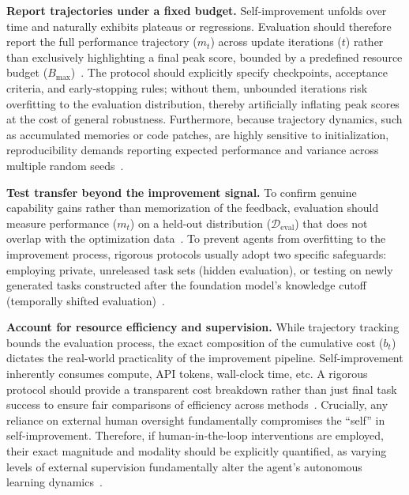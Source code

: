 \textbf{Report trajectories under a fixed budget.}
Self-improvement unfolds over time and naturally exhibits plateaus or regressions. Evaluation should therefore report the full performance trajectory ($m_t$) across update iterations ($t$) rather than exclusively highlighting a final peak score,  bounded by a predefined resource budget ($B_{\text{max}}$)~\citep{xi2024agentgym}. The protocol should explicitly specify checkpoints, acceptance criteria, and early-stopping rules; without them, unbounded iterations risk overfitting to the evaluation distribution, thereby artificially inflating peak scores at the cost of general robustness. Furthermore, because trajectory dynamics, such as accumulated memories or code patches, are highly sensitive to initialization, reproducibility demands reporting expected performance and variance across multiple random seeds~\citep{siegel2024corebenchfosteringcredibilitypublished, aleithan2024swebenchenhancedcodingbenchmark}.


\textbf{Test transfer beyond the improvement signal.}
To confirm genuine capability gains rather than  memorization of the feedback, evaluation should measure performance ($m_t$) on a  held-out distribution ($\mathcal{D}_{\text{eval}}$) that does not overlap with the optimization data~\citep{deng2023mindweb, lu2024weblinx}. To prevent agents from overfitting to the improvement process, rigorous protocols usually adopt two specific safeguards: employing private, unreleased task sets (hidden evaluation), or testing on newly generated tasks constructed after the foundation model's knowledge cutoff (temporally shifted evaluation)~\citep{gu2023maniskill2unifiedbenchmarkgeneralizable, mialon2023gaiabenchmarkgeneralai}.


\textbf{Account for resource efficiency and supervision.}
While trajectory tracking bounds the evaluation process, the exact composition of the cumulative cost ($b_t$) dictates the real-world practicality of the improvement pipeline. Self-improvement inherently consumes compute, API tokens, wall-clock time, etc. A rigorous protocol should provide a transparent cost breakdown rather than just final task success to ensure fair comparisons of efficiency across methods~\citep{lange2025shinkaevolveopenendedsampleefficientprogram, ni2025gittaskbenchbenchmarkcodeagents}. Crucially, any reliance on external human oversight fundamentally compromises the ``self'' in self-improvement. Therefore, if human-in-the-loop interventions are employed, their exact magnitude and modality should be explicitly quantified, as varying levels of external supervision fundamentally alter the agent's autonomous learning dynamics~\citep{wang2024mintevaluatingllmsmultiturn, drouin2024workarenacapablewebagents}.



